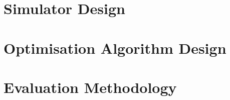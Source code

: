 
\section{Simulator Design}

\section{Optimisation Algorithm Design}

\section{Evaluation Methodology}




